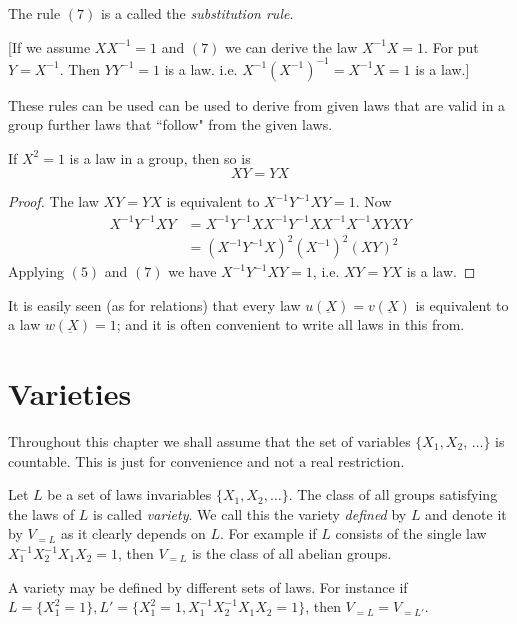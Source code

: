 The rule $(7)$ is a called the \textit{substitution rule}.

[If we assume $XX^{-1} =1$ and $(7)$ we can derive the law $X^{-1}X =
  1$. For put $Y = X^{-1}$. Then $YY^{-1} =1$ is a law. i.e. $X^{-1}
  (X^{-1})^{-1}= X^{-1} X=1$ is a law.] 

These rules can be used can be used to derive from given laws that are
valid in a group further laws that ``follow" from the given laws. 

\begin{example}
  If $X^2 = 1$ is a law in a group, then so is
  $$
  XY = YX
  $$
\end{example}

\begin{proof}
  The law $XY = YX$ is equivalent to $X^{-1} Y^{-1} XY = 1$. Now 
  \begin{align*}
    X^{-1} Y^{-1} XY & = X^{-1}Y^{-1} XX^{-1} Y^{-1}XX^{-1}X^{-1} XYXY\\
    & = (X^{-1} Y^{-1}X)^2 (X^{-1})^2 (XY)^2
  \end{align*}
  Applying $(5)$ and $(7)$ we have $X^{-1}Y^{-1}XY = 1$, i.e. $XY =
  YX$ is a law.  
\end{proof}

It is easily seen (as for relations) that every law $u(\underbar{X}) =
v(\underbar{X})$ is equivalent to a law $w (\underbar{X}) = 1$; and it
is often convenient to write all laws in this from. 

\section{Varieties} %

Throughout this chapter we shall assume that the set of variables 
$\bigg\{ X_1, X_2$, $\ldots \bigg\}$ is countable. This is just for
convenience and not a real restriction. 

Let $L$ be a set of laws invariables $\bigg\{ X_1, X_2, \ldots
\bigg\}$. The class of all groups satisfying the laws of $L$ is called
\textit{variety}. We call this the variety \textit{defined} by $L$ and
denote it by $V_{=L}$ as it clearly depends on $L$. For example if $L$
consists of the single law $X^{-1}_1 X^{-1}_2  X_1 X_2 =1$, then
$V_{=L}$ is the class of all abelian groups. 

A variety may be defined by different sets of laws. For instance if $L
= \bigg\{ X^2_1 = 1\bigg\}, L' = \bigg\{ X^2_1 = 1, X^{-1}_1X^{-1}_2
X_1 X_2 = 1\bigg\}$, then $V_{=L}= V_{=L'}$. 

